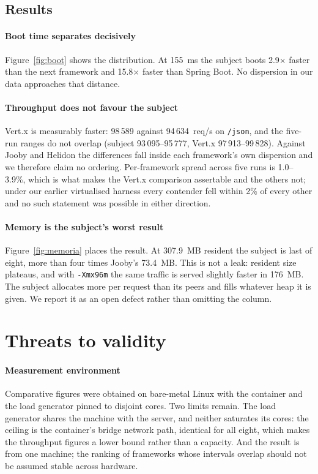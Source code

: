 \documentclass[preprint,12pt]{elsarticle}
\begin{document}
\subsection{Results}

\paragraph{Boot time separates decisively}
Figure~\ref{fig:boot} shows the distribution. At 155~ms the subject boots
2.9$\times$ faster than the next framework and
15.8$\times$ faster than Spring Boot. No dispersion in our data approaches that
distance.

\paragraph{Throughput does not favour the subject}
Vert.x is measurably faster: 98\,589 against 94\,634~req/s on \texttt{/json},
and the five-run ranges do not overlap (subject 93\,095--95\,777, Vert.x
97\,913--99\,828). Against Jooby and Helidon the differences fall inside each
framework's own dispersion and we therefore claim no ordering. Per-framework
spread across five runs is 1.0--3.9\%, which is what makes the Vert.x
comparison assertable and the others not; under our earlier virtualised harness
every contender fell within 2\% of every other and no such statement was
possible in either direction.

\paragraph{Memory is the subject's worst result}
Figure~\ref{fig:memoria} places the result. At 307.9~MB resident the subject
is last of eight, more than four times Jooby's
73.4~MB. This is not a leak: resident size plateaus, and with
\texttt{-Xmx96m} the same traffic is served slightly faster in 176~MB. The
subject allocates more per request than its peers and fills whatever heap it is
given. We report it as an open defect rather than omitting the column.

\section{Threats to validity}
\label{sec:threats}

\paragraph{Measurement environment}
Comparative figures were obtained on bare-metal Linux with the container and the
load generator pinned to disjoint cores. Two limits remain. The load generator
shares the machine with the server, and neither saturates its cores: the ceiling
is the container's bridge network path, identical for all eight, which makes the
throughput figures a lower bound rather than a capacity. And the result is from
one machine; the ranking of frameworks whose intervals overlap should not be
assumed stable across hardware.
\end{document}
